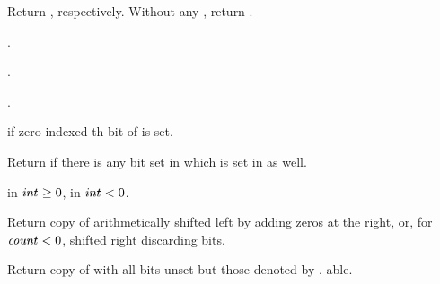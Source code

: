 \begin{LIST}{1cm}
  {
  Return ,
  respectively. Without any , return .
  }

  {
    .
 }

  {
    .
  }

  {
  .
  }

  {
  \retval{\T} if zero-indexed th bit of  is set.
  }

  {Return \retval{\T} if
  there is any bit set in  which is set in  as well.
  }

  {
     in $\text{\VAR{int}}\ge 0$,
     in $\text{\VAR{int}}< 0$. 
  }

  {
  Return copy of  arithmetically shifted left by
   adding zeros
  at the right, or, for $\VAR{count}<0$, shifted right discarding
  bits. 
  }

  {
  Return copy of  with all bits unset but those denoted by
  . able.
  }


\end{LIST}

